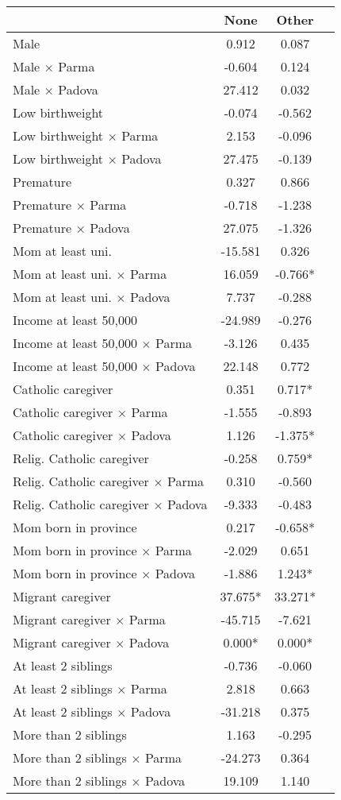 \begin{tabular}{l c c c}
\toprule
& None & Other \\
\midrule
Male &     0.912 &     0.087 \\
Male $\times$ Parma &    -0.604 &     0.124 \\
Male $\times$ Padova &    27.412 &     0.032 \\
Low birthweight &    -0.074 &    -0.562 \\
Low birthweight $\times$ Parma &     2.153 &    -0.096 \\
Low birthweight $\times$ Padova &    27.475 &    -0.139 \\
Premature &     0.327 &     0.866 \\
Premature $\times$ Parma &    -0.718 &    -1.238 \\
Premature $\times$ Padova &    27.075 &    -1.326 \\
Mom at least uni. &   -15.581 &     0.326 \\
Mom at least uni. $\times$ Parma &    16.059 & -0.766* \\
Mom at least uni. $\times$ Padova &     7.737 &    -0.288 \\
Income at least 50,000 &   -24.989 &    -0.276 \\
Income at least 50,000 $\times$ Parma &    -3.126 &     0.435 \\
Income at least 50,000 $\times$ Padova &    22.148 &     0.772 \\
Catholic caregiver &     0.351 & 0.717* \\
Catholic caregiver $\times$ Parma &    -1.555 &    -0.893 \\
Catholic caregiver $\times$ Padova &     1.126 & -1.375* \\
Relig. Catholic caregiver &    -0.258 & 0.759* \\
Relig. Catholic caregiver $\times$ Parma &     0.310 &    -0.560 \\
Relig. Catholic caregiver $\times$ Padova &    -9.333 &    -0.483 \\
Mom born in province &     0.217 & -0.658* \\
Mom born in province $\times$ Parma &    -2.029 &     0.651 \\
Mom born in province $\times$ Padova &    -1.886 & 1.243* \\
Migrant caregiver & 37.675* & 33.271* \\
Migrant caregiver $\times$ Parma &   -45.715 &    -7.621 \\
Migrant caregiver $\times$ Padova & 0.000* & 0.000* \\
At least 2 siblings &    -0.736 &    -0.060 \\
At least 2 siblings $\times$ Parma &     2.818 &     0.663 \\
At least 2 siblings $\times$ Padova &   -31.218 &     0.375 \\
More than 2 siblings &     1.163 &    -0.295 \\
More than 2 siblings $\times$ Parma &   -24.273 &     0.364 \\
More than 2 siblings $\times$ Padova &    19.109 &     1.140 \\
\bottomrule
\end{tabular}
